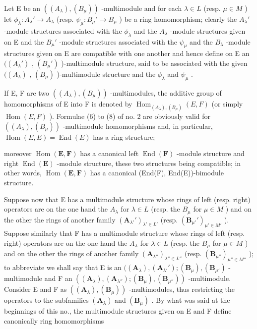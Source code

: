Let E be an \(((A_{\lambda}), (B_{\mu}))\) -multimodule and for each \(\lambda \in L\) (resp. \(\mu \in M\) ) let \(\phi_{\lambda}: A_{\lambda}' \to A_{\lambda}\) (resp. \(\psi_{\mu}: B_{\mu}' \to B_{\mu}\) ) be a ring homomorphism; clearly the \(A_{\lambda}'\) -module structures associated with the \(\phi_{\lambda}\) and the \(A_{\lambda}\) -module structures given on E and the \(B_{\mu}'\) -module structures associated with the \(\psi_{\mu}\) and the \(B_{\lambda}\) -module structures given on E are compatible with one another and hence define on E an \(((A_{\lambda}')\) , \((B_{\mu}')\) )-multimodule structure, said to be associated with the given \(((A_{\lambda})\) , \((B_{\mu})\) )-multimodule structure and the \(\phi_{\lambda}\) and \(\psi_{\mu}\) .

If E, F are two \(((A_{\lambda}), (B_{\mu}))\) -multimodules, the additive group of homomorphisms of E into F is denoted by \(\operatorname{Hom}_{(A_{\lambda}), (B_{\mu})}(E, F)\) (or simply \(\operatorname{Hom}(E, F)\) ). Formulae (6) to (8) of no. 2 are obviously valid for \(((A_{\lambda}), (B_{\mu}))\) -multimodule homomorphisms and, in particular, \(\operatorname{Hom}(E, E) = \operatorname{End}(E)\) has a ring structure;

moreover \(\operatorname{Hom}(\mathbf{E},\mathbf{F})\) has a canonical left \(\operatorname{End}(\mathbf{F})\) -module structure and right \(\operatorname{End}(\mathbf{E})\) -module structure, these two structures being compatible; in other words, \(\operatorname{Hom}(\mathbf{E},\mathbf{F})\) has a canonical (End(F), End(E))-bimodule structure.

Suppose now that E has a multimodule structure whose rings of left (resp. right) operators are on the one hand the \(A_{\lambda}\) for \(\lambda \in L\) (resp. the \(B_{\mu}\) for \(\mu \in M\) ) and on the other the rings of another family \((\mathbf{A}_{\lambda'}')_{\lambda' \in L'}\) (resp. \((\mathbf{B}_{\mu'}')_{\mu' \in M'}\) ). Suppose similarly that F has a multimodule structure whose rings of left (resp. right) operators are on the one hand the \(A_{\lambda}\) for \(\lambda \in L\) (resp. the \(B_{\mu}\) for \(\mu \in M\) ) and on the other the rings of another family \((\mathbf{A}_{\lambda''})_{\lambda'' \in L''}\) (resp. \((\mathbf{B}_{\mu''})_{\mu'' \in M''}\) ); to abbreviate we shall say that E is an \(((\mathbf{A}_{\lambda}), (\mathbf{A}_{\lambda'}'); (\mathbf{B}_{\mu}), (\mathbf{B}_{\mu'})\) -multimodule and F an \(((\mathbf{A}_{\lambda}), (\mathbf{A}_{\lambda''}); (\mathbf{B}_{\mu}), (\mathbf{B}_{\mu''}))\) -multimodule. Consider E and F as \(((\mathbf{A}_{\lambda}), (\mathbf{B}_{\mu}))\) -multimodules, thus restricting the operators to the subfamilies \((\mathbf{A}_{\lambda})\) and \((\mathbf{B}_{\mu})\) . By what was said at the beginnings of this no., the multimodule structures given on E and F define canonically ring homomorphisms

